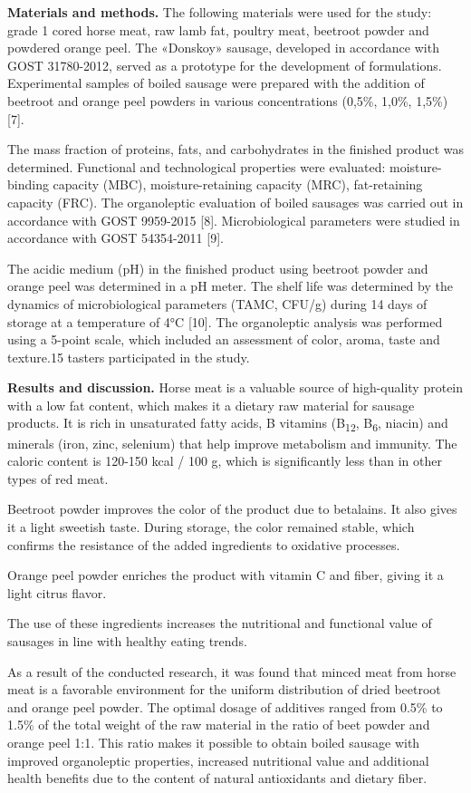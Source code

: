 \begin{multicols}{2}
{\bfseries Materials and methods.} The following materials were used for
the study: grade 1 cored horse meat, raw lamb fat, poultry meat,
beetroot powder and powdered orange peel. The «Donskoy» sausage,
developed in accordance with GOST 31780-2012, served as a prototype for
the development of formulations. Experimental samples of boiled sausage
were prepared with the addition of beetroot and orange peel powders in
various concentrations (0,5\%, 1,0\%, 1,5\%) {[}7{]}.

The mass fraction of proteins, fats, and carbohydrates in the finished
product was determined. Functional and technological properties were
evaluated: moisture-binding capacity (MBC), moisture-retaining capacity
(MRC), fat-retaining capacity (FRC). The organoleptic evaluation of
boiled sausages was carried out in accordance with GOST 9959-2015
{[}8{]}. Microbiological parameters were studied in accordance with GOST
54354-2011 {[}9{]}.

The acidic medium (pH) in the finished product using beetroot powder and
orange peel was determined in a pH meter. The shelf life was determined
by the dynamics of microbiological parameters (TAMC, CFU/g) during 14
days of storage at a temperature of 4°C {[}10{]}. The organoleptic
analysis was performed using a 5-point scale, which included an
assessment of color, aroma, taste and texture.15 tasters participated
in the study.

{\bfseries Results and discussion.} Horse meat is a valuable source of
high-quality protein with a low fat content, which makes it a dietary
raw material for sausage products. It is rich in unsaturated fatty
acids, B vitamins (B\textsubscript{12}, B\textsubscript{6}, niacin) and
minerals (iron, zinc, selenium) that help improve metabolism and
immunity. The caloric content is 120-150 kcal / 100 g, which is
significantly less than in other types of red meat.

Beetroot powder improves the color of the product due to betalains. It
also gives it a light sweetish taste. During storage, the color remained
stable, which confirms the resistance of the added ingredients to
oxidative processes.

Orange peel powder enriches the product with vitamin C and fiber, giving
it a light citrus flavor.

The use of these ingredients increases the nutritional and functional
value of sausages in line with healthy eating trends.

As a result of the conducted research, it was found that minced meat
from horse meat is a favorable environment for the uniform distribution
of dried beetroot and orange peel powder. The optimal dosage of
additives ranged from 0.5\% to 1.5\% of the total weight of the raw
material in the ratio of beet powder and orange peel 1:1. This ratio
makes it possible to obtain boiled sausage with improved organoleptic
properties, increased nutritional value and additional health benefits
due to the content of natural antioxidants and dietary fiber.


\end{multicols}
